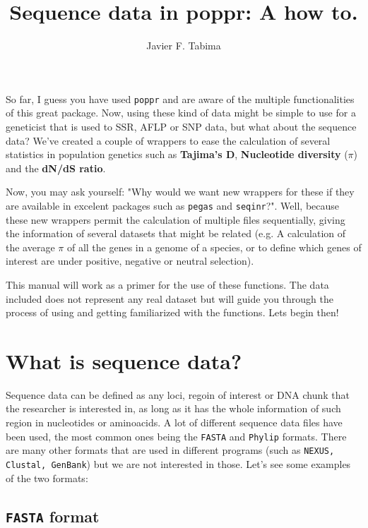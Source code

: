 \documentclass[letterpaper]{article}\usepackage[]{graphicx}\usepackage[]{color}
\begin{document}
\title{Sequence data in poppr: A how to.}


\author{Javier F. Tabima}

\maketitle
So far, I guess you have used \texttt{poppr} and are aware of the multiple functionalities of this great package. Now, using these kind of data might be simple to use for a geneticist that is used to SSR, AFLP or SNP data, but what about the sequence data?
We've created a couple of wrappers to ease the calculation of several statistics in population genetics such as \textbf{Tajima's D}, \textbf{Nucleotide diversity} ($\pi$) and the \textbf{dN/dS ratio}. 

Now, you may ask yourself: "Why would we want new wrappers for these if they are available in excelent packages such as \texttt{pegas} and \texttt{seqinr}?". Well, because these new wrappers permit the calculation of multiple files sequentially, giving the information of several datasets that might be related (e.g. A calculation of the average $\pi$ of all the genes in a genome of a species, or to define which genes of interest are under positive, negative or neutral selection).

This manual will work as a primer for the use of these functions. The data included does not represent any real dataset but will guide you through the process of using and getting familiarized with the functions. Lets begin then!

\section{What is sequence data?}

Sequence data can be defined as any loci, regoin of interest or DNA chunk that the researcher is interested in, as long as it has the whole information of such region in nucleotides or aminoacids. A lot of different sequence data files have been used, the most common ones being the \texttt{FASTA} and \texttt{Phylip} formats. There are many other formats that are used in different programs (such as \texttt{NEXUS, Clustal, GenBank}) but we are not interested in those. Let's see some examples of the two formats:

\subsection{\texttt{FASTA} format}
\end{document}
